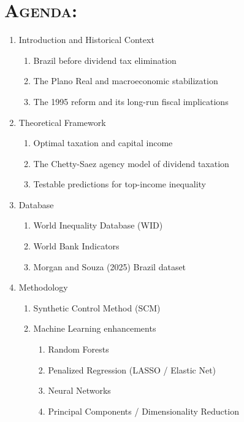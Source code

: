 \documentclass[11pt,a4paper]{article}
\begin{document}
\newpage
\section{\textsc{Agenda:}}

\begin{enumerate}[leftmargin= 2cm]
    \item Introduction and Historical Context
    \begin{enumerate}
        \item Brazil before dividend tax elimination
        \item The Plano Real and macroeconomic stabilization
        \item The 1995 reform and its long-run fiscal implications
    \end{enumerate}

    \item Theoretical Framework
    \begin{enumerate}
        \item Optimal taxation and capital income
        \item The Chetty-Saez agency model of dividend taxation
        \item Testable predictions for top-income inequality
    \end{enumerate}

    \item Database
    \begin{enumerate}
        \item World Inequality Database (WID)
        \item World Bank Indicators
        \item Morgan and Souza (2025) Brazil dataset
    \end{enumerate}

    \item Methodology
    \begin{enumerate}
        \item Synthetic Control Method (SCM)
        \item Machine Learning enhancements
        \begin{enumerate}
            \item Random Forests
            \item Penalized Regression (LASSO / Elastic Net)
            \item Neural Networks
            \item Principal Components / Dimensionality Reduction
        \end{enumerate}
    \end{enumerate}


\end{enumerate}
\end{document}
